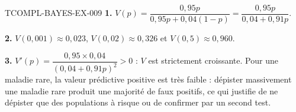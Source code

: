 \begin{corrige}{TCOMPL-BAYES-EX-009}
\textbf{1.} $V(p)=\dfrac{0{,}95p}{0{,}95p+0{,}04(1-p)}
=\dfrac{0{,}95p}{0{,}04+0{,}91p}$.

\textbf{2.} $V(0{,}001)\approx0{,}023$, $V(0{,}02)\approx0{,}326$ et
$V(0{,}5)\approx0{,}960$.

\textbf{3.} $V'(p)=\dfrac{0{,}95\times0{,}04}{(0{,}04+0{,}91p)^2}>0$ : $V$ est
strictement croissante. Pour une maladie rare, la valeur prédictive positive
est très faible : dépister massivement une maladie rare produit une majorité
de faux positifs, ce qui justifie de ne dépister que des populations à risque
ou de confirmer par un second test.
\end{corrige}
